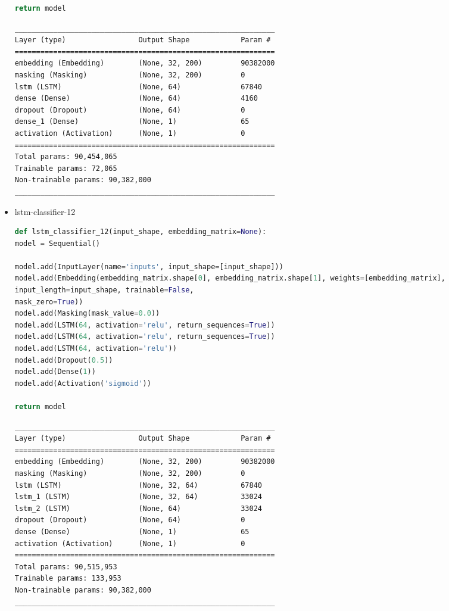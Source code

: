 \documentclass{article}
\begin{document}
\begin{itemize}
\begin{lstlisting}[language=Python, caption=Дефиниция на lstm-classifier-11.]
return model
\end{lstlisting}

\begin{lstlisting}[numbers=none, caption=Обобщение на lstm-classifier-11.]
_____________________________________________________________
Layer (type)                 Output Shape            Param #
=============================================================
embedding (Embedding)        (None, 32, 200)         90382000
masking (Masking)            (None, 32, 200)         0
lstm (LSTM)                  (None, 64)              67840
dense (Dense)                (None, 64)              4160
dropout (Dropout)            (None, 64)              0
dense_1 (Dense)              (None, 1)               65
activation (Activation)      (None, 1)               0
=============================================================
Total params: 90,454,065
Trainable params: 72,065
Non-trainable params: 90,382,000
_____________________________________________________________
\end{lstlisting}

\item lstm-classifier-12

\begin{lstlisting}[language=Python, caption=Дефиниция на lstm-classifier-12.]
def lstm_classifier_12(input_shape, embedding_matrix=None):
model = Sequential()

model.add(InputLayer(name='inputs', input_shape=[input_shape]))
model.add(Embedding(embedding_matrix.shape[0], embedding_matrix.shape[1], weights=[embedding_matrix],
input_length=input_shape, trainable=False,
mask_zero=True))
model.add(Masking(mask_value=0.0))
model.add(LSTM(64, activation='relu', return_sequences=True))
model.add(LSTM(64, activation='relu', return_sequences=True))
model.add(LSTM(64, activation='relu'))
model.add(Dropout(0.5))
model.add(Dense(1))
model.add(Activation('sigmoid'))

return model
\end{lstlisting}

\begin{lstlisting}[numbers=none, caption=Обобщение на lstm-classifier-12.]
_____________________________________________________________
Layer (type)                 Output Shape            Param #
=============================================================
embedding (Embedding)        (None, 32, 200)         90382000
masking (Masking)            (None, 32, 200)         0
lstm (LSTM)                  (None, 32, 64)          67840
lstm_1 (LSTM)                (None, 32, 64)          33024
lstm_2 (LSTM)                (None, 64)              33024
dropout (Dropout)            (None, 64)              0
dense (Dense)                (None, 1)               65
activation (Activation)      (None, 1)               0
=============================================================
Total params: 90,515,953
Trainable params: 133,953
Non-trainable params: 90,382,000
_____________________________________________________________
\end{lstlisting}


\end{itemize}
\end{document}
